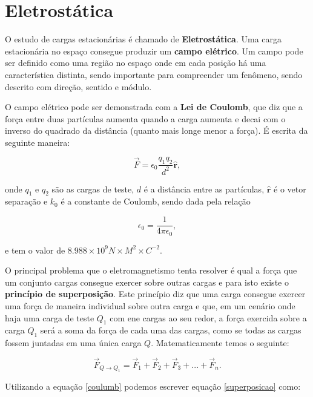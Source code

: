 \newpage\section{Eletrostática}
O estudo de cargas estacionárias é chamado de \textbf{Eletrostática}. Uma carga estacionária no espaço consegue produzir um \textbf{campo elétrico}. Um campo pode ser definido como uma região no espaço onde em cada posição há uma característica distinta, sendo importante para compreender um fenômeno, sendo descrito com direção, sentido e módulo. 

O campo elétrico pode ser demonstrada com a \textbf{Lei de Coulomb}, que diz que a força entre duas partículas aumenta quando a carga aumenta e decai com o inverso do quadrado da distância (quanto mais longe menor a força). É escrita da seguinte maneira:

\begin{equation} \label{coulumb}
    \Vec{F} = \epsilon_{0} \frac{{q_{1}}{q_{2}}}{d^2} \hat{\textbf{r}},
\end{equation}



onde $q_{1}$ e $q_{2}$ são as cargas de teste, $d$ é a distância entre as partículas, $\hat{\textbf{r}}$ é o vetor separação e $k_{0}$ é a constante de Coulomb, sendo dada pela relação
 
\begin{equation*}
    \epsilon_{0}= \frac{1}{4 \pi \epsilon_{0}},
\end{equation*}

e tem o valor de $8.988 \times 10^9 N\times M^2 \times C^{-2}$.

O principal problema que o eletromagnetismo tenta resolver é qual a força que um conjunto cargas consegue exercer sobre outras cargas e para isto existe o \textbf{princípio de superposição}. Este princípio diz que uma carga consegue exercer uma força de maneira individual sobre outra carga e que, em um cenário onde haja uma carga de teste $Q_{1}$ com ene cargas ao seu redor, a força exercida sobre a carga $Q_{1}$ será a soma da força de cada uma das cargas, como se todas as cargas fossem juntadas em uma única carga $Q$. Matematicamente temos o seguinte:

\begin{equation} \label{superposicao}
    \vec{F}_{Q \rightarrow Q_{1}} = \vec{F}_{1} + \vec{F}_{2} + \vec{F}_{3}+...+\vec{F}_{n}.
\end{equation}

Utilizando a equação \ref{coulumb} podemos escrever equação \ref{superposicao} como:

